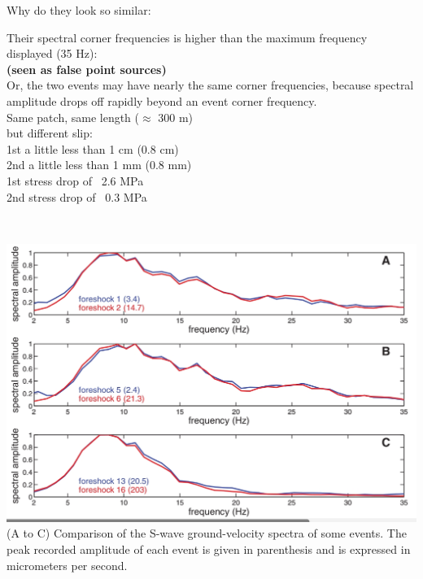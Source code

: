 \documentclass[aspectratio=43,9pt]{beamer}
\begin{document}
\begin{frame}{Why do they look so similar:}

\begin{minipage}{0.45\linewidth}

 Their spectral corner frequencies is higher than
 the maximum frequency displayed (35 Hz): \\
 {\bf (seen as false point sources)} \\
 \vskip 0.1cm
 Or, the two events may have nearly the same corner frequencies, 
 because spectral amplitude drops off rapidly beyond an event corner frequency. \\
 \vskip 0.1cm
 Same patch, same length ($\approx$ 300 m) \\
 but different slip: \\
 1st a little less than 1 cm (0.8 cm) \\ 
 2nd a little less than 1 mm (0.8 mm) \\ 
 1st stress drop of ~2.6 MPa  \\
 2nd stress drop of ~0.3 MPa 
\end{minipage} \,
\begin{minipage}{0.45\linewidth}
 \includegraphics[width=1\linewidth]{Figs/fig5.jpg} \\
 {\small (A to C) Comparison of the S-wave ground-velocity spectra of some events. The peak recorded amplitude of
 each event is given in parenthesis and is expressed in micrometers per second.}
\end{minipage}

 
\end{frame}
\end{document}
